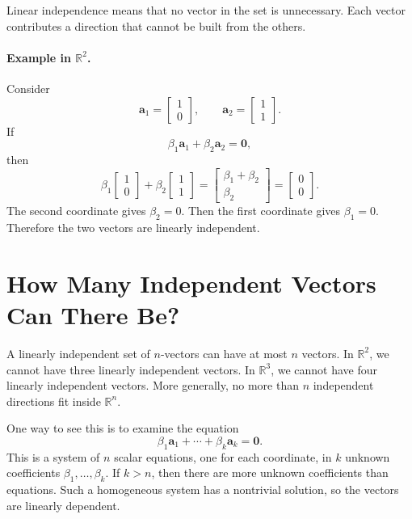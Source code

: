 Linear independence means that no vector in the set is unnecessary. Each vector contributes a direction that cannot be built from the others.

\paragraph{Example in \(\mathbb{R}^2\).}
Consider
\[
    \mathbf{a}_1=\begin{bmatrix}1\\0\end{bmatrix},
    \qquad
    \mathbf{a}_2=\begin{bmatrix}1\\1\end{bmatrix}.
\]
If
\[
    \beta_1\mathbf{a}_1+\beta_2\mathbf{a}_2=\mathbf{0},
\]
then
\[
    \beta_1\begin{bmatrix}1\\0\end{bmatrix}
    +\beta_2\begin{bmatrix}1\\1\end{bmatrix}
    =
    \begin{bmatrix}\beta_1+\beta_2\\ \beta_2\end{bmatrix}
    =
    \begin{bmatrix}0\\0\end{bmatrix}.
\]
The second coordinate gives \(\beta_2=0\). Then the first coordinate gives \(\beta_1=0\). Therefore the two vectors are linearly independent.

\section{How Many Independent Vectors Can There Be?}
\label{mf:maximal-independent-sets}
\label{mf:dimension}

A linearly independent set of \(n\)-vectors can have at most \(n\) vectors. In \(\mathbb{R}^2\), we cannot have three linearly independent vectors. In \(\mathbb{R}^3\), we cannot have four linearly independent vectors. More generally, no more than \(n\) independent directions fit inside \(\mathbb{R}^n\).

One way to see this is to examine the equation
\[
    \beta_1\mathbf{a}_1+\cdots+\beta_k\mathbf{a}_k=\mathbf{0}.
\]
This is a system of \(n\) scalar equations, one for each coordinate, in \(k\) unknown coefficients \(\beta_1,\ldots,\beta_k\). If \(k>n\), then there are more unknown coefficients than equations. Such a homogeneous system has a nontrivial solution, so the vectors are linearly dependent.


